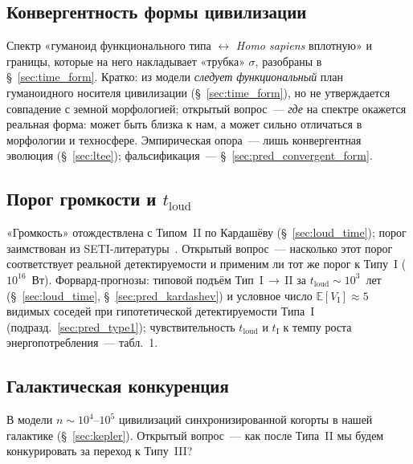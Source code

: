 \documentclass[12pt,a4paper]{article}
\begin{document}
\subsection{Конвергентность формы цивилизации}
\label{sec:open_civ_form}

Спектр «гуманоид функционального типа $\leftrightarrow$ \emph{Homo sapiens} вплотную» и границы, которые на него накладывает «трубка» $\sigma$, разобраны в \S~\ref{sec:time_form}. Кратко: из модели \emph{следует} \emph{функциональный} план гуманоидного носителя цивилизации (\S~\ref{sec:time_form}), но не утверждается совпадение с земной морфологией; открытый вопрос~--- \emph{где} на спектре окажется реальная форма: может быть близка к нам, а может сильно отличаться в морфологии и техносфере. Эмпирическая опора~--- лишь конвергентная эволюция (\S~\ref{sec:ltee}); фальсификация~--- \S~\ref{sec:pred_convergent_form}.

\subsection{Порог громкости и \texorpdfstring{$t_{\mathrm{loud}}$}{t\_loud}}
\label{sec:open_loud}

«Громкость» отождествлена с Типом~II по Кардашёву (\S~\ref{sec:loud_time}); порог заимствован из SETI-литературы~\cite{Wright2014,Hanson2021}. Открытый вопрос~--- насколько этот порог соответствует реальной детектируемости и применим ли тот же порог к Типу~I ($10^{16}$~Вт). Форвард-прогнозы: типовой подъём Тип~I\,$\to$\,II за $t_{\mathrm{loud}} \sim 10^3$~лет (\S~\ref{sec:loud_time}, \S~\ref{sec:pred_kardashev}) и условное число $\mathbb{E}[V_{\mathrm{I}}] \approx 5$ видимых соседей при гипотетической детектируемости Типа~I (подразд.~\ref{sec:pred_type1}); чувствительность $t_{\mathrm{loud}}$ и $t_{\mathrm{I}}$ к темпу роста энергопотребления~--- табл.~1.

\subsection{Галактическая конкуренция}
\label{sec:galactic_competition}

В модели $n \sim 10^4$--$10^5$ цивилизаций синхронизированной когорты в нашей галактике (\S~\ref{sec:kepler}). Открытый вопрос~--- как после Типа~II мы будем конкурировать за переход к Типу~III?



\end{document}
